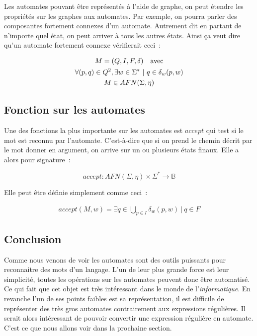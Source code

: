 \vphantom{}

Les automates pouvant être représentés à l'aide de graphe, on peut étendre les
propriétés sur les graphes aux automates. Par exemple, on pourra parler des
composantes fortement connexes d'un automate. Autrement dit en partant de
n'importe quel état, on peut arriver à tous les autres états. Ainsi ça veut
dire qu'un automate fortement connexe vérifierait ceci~:

\begin{gather*}
    M = (Q, I, F, \delta) \quad \text{avec} \\
    \forall (p, q) \in Q^2, \exists w \in \Sigma^* ~|~ q \in \delta_w(p, w) \notag \\
    M \in AFN(\Sigma, \eta) \notag
\end{gather*}

\subsection{Fonction sur les automates}

Une des fonctions la plus importante sur les automates est \(accept\) qui test
si le mot est reconnu par l'automate. C'est-à-dire que si on prend le chemin
décrit par le mot donner en argument, on arrive sur un ou plusieurs états
finaux. Elle a alors pour signature~:

\[
    accept: AFN(\Sigma, \eta) \times \Sigma^* \to \mathbb{B}
\]

Elle peut être définie simplement comme ceci~:

\begin{align*}
    accept(M, w) = \exists q \in \bigcup_{p \in I} \delta_w(p, w) ~|~ q \in F
\end{align*}

\subsection{Conclusion}

Comme nous venons de voir les automates sont des outils puissants pour
reconnaitre des mots d'un langage. L'un de leur plus grande force est leur
simplicité, toutes les opérations sur les automates peuvent donc être
automatisé. Ce qui fait que cet objet est très intéressant dans le monde de
l'\textit{informatique}. En revanche l'un de ses points faibles est sa
représentation, il est difficile de représenter des très gros automates
contrairement aux expressions régulières. Il serait alors intéressant de
pouvoir convertir une expression régulière en automate. C'est ce que nous
allons voir dans la prochaine section.